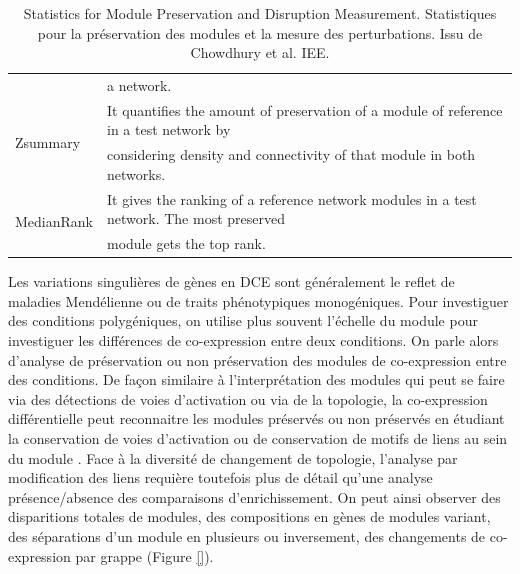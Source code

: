 \begin{table}[h!]
{\begin{tabular}{@{}ll@{}}
                                                                                            & a network.                                                                                          \\
\multirow{2}{*}{Zsummary \cite{Langfelder2011}}                                                         & It quantifies the amount of preservation of a module of reference in a test network by              \\
                                                                                            & considering density and connectivity of that module in both networks.                               \\
\multirow{2}{*}{MedianRank \cite{Langfelder2011}}                                                       & It gives the ranking of a reference network modules in a test network. The most preserved           \\
                                                                                            & module gets the top rank.                                                                           \\ \cmidrule(l){2-2} 
\end{tabular}
}
\caption[Statistiques pour la préservation des modules et la mesure des perturbations]{Statistics for Module Preservation and Disruption Measurement. Statistiques pour la préservation des modules et la mesure des perturbations. Issu de Chowdhury et al. \cite{Chowdhury2019}  IEE. }
\label{table:chowdury_metrics_DCE}
\end{table}

Les variations singulières de gènes en DCE sont généralement le reflet de maladies Mendélienne ou de traits phénotypiques monogéniques. Pour investiguer des conditions polygéniques, on utilise plus souvent l'échelle du module pour investiguer les différences de co-expression entre deux conditions. On parle alors d'analyse de préservation ou non préservation des modules de co-expression entre des conditions. De façon similaire à l'interprétation des modules qui peut se faire via des détections de voies d'activation ou via de la topologie, la co-expression différentielle peut reconnaitre les modules préservés ou non préservés en étudiant la conservation de voies d'activation ou de conservation de motifs de liens au sein du module \cite{Chowdhury2019}. Face à la diversité de changement de topologie, l'analyse par modification des liens requière toutefois plus de détail qu'une analyse présence/absence des comparaisons d'enrichissement. On peut ainsi observer des disparitions totales de modules, des compositions en gènes de modules variant, des séparations d'un module en plusieurs ou inversement, des changements de co-expression par grappe (Figure \ref{}).

